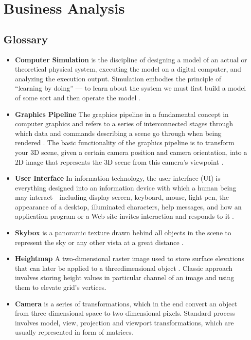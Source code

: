 \documentclass{report}
\begin{document}
\chapter{Business Analysis}
\section{Glossary}
\begin{itemize}
\item \textbf{Computer Simulation} is the discipline of designing a model of an actual or theoretical physical system, executing
the model on a digital computer, and analyzing the execution output. Simulation embodies the principle of
“learning by doing” — to learn about the system we must first build a model of some sort and then operate the
model \cite{gloss_1}.
\item \textbf{Graphics Pipeline} The graphics pipeline in a fundamental concept in computer graphics and refers to a series of
interconnected stages through which data and commands describing a scene go through when being rendered \cite{gloss_2}.
The basic functionality of the graphics pipeline is to transform your 3D scene, given a certain camera position and
camera orientation, into a 2D image that represents the 3D scene from this camera’s viewpoint \cite{gloss_3}.
\item\textbf{User Interface} In information technology, the user interface (UI) is everything designed into an information device
with which a human being may interact - including display screen, keyboard, mouse, light pen, the appearance of
a desktop, illuminated characters, help messages, and how an application program or a Web site invites interaction
and responds to it \cite{gloss_4}.
\item \textbf{Skybox} is a panoramic texture drawn behind all objects in the scene to represent the sky or any other vista at a
great distance \cite{gloss_5}.
\item \textbf{Heightmap} A two-dimensional raster image used to store surface elevations that can later be applied to a threedimensional
object \cite{gloss_6}. Classic approach involves storing height values in particular channel of an image and using
them to elevate grid’s vertices.
\item \textbf{Camera} is a series of transformations, which in the end convert an object from three dimensional space to two
dimensional pixels. Standard process involves model, view, projection and viewport transformations, which are
usually represented in form of matrices.
\end{itemize}
\end{document}
